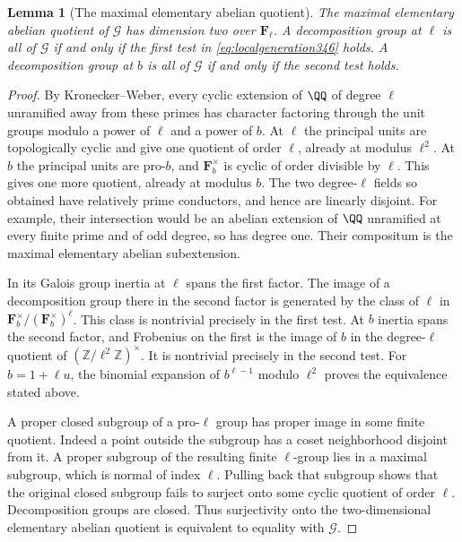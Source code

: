 \documentclass[a4paper,11pt]{article}
\newtheorem{lemma}[proposition]{Lemma}
\theoremstyle{definition}
\theoremstyle{remark}
\newcommand{\ZZ}{\mathbb Z}\newcommand{\ord}{\operatorname{ord}}
\numberwithin{equation}{section}
\begin{document}
\begin{lemma}[The maximal elementary abelian quotient]\leavevmode\label{lem:localgeneration346}
The maximal elementary abelian quotient of $\mathcal G$ has
dimension two over $\mathbf F_\ell$. A decomposition group at
$\ell$ is all of $\mathcal G$ if and only if the first test in
\eqref{eq:localgeneration346} holds. A decomposition group at
$b$ is all of $\mathcal G$ if and only if the second test holds.
\end{lemma}
\begin{proof}
By Kronecker--Weber, every cyclic extension of $\QQ$ of degree
$\ell$ unramified away from these primes has character factoring
through the unit groups modulo a power of $\ell$ and a power of
$b$. At $\ell$ the principal units are topologically cyclic and
give one quotient of order $\ell$, already at modulus $\ell^2$.
At $b$ the principal units are pro-$b$, and
$\mathbf F_b^\times$ is cyclic of order divisible by $\ell$.
This gives one more quotient, already at modulus $b$. The two
degree-$\ell$ fields so obtained have relatively prime conductors,
and hence are linearly disjoint. For example, their intersection
would be an abelian extension of $\QQ$ unramified at every finite
prime and of odd degree, so has degree one. Their compositum
is the maximal elementary abelian subextension.
\cite[Chapters V and VI]{V-III-V-cft101}

In its Galois group inertia at $\ell$ spans the first factor.
The image of a decomposition group there in the second factor is
generated by the class of $\ell$ in
$\mathbf F_b^\times/(\mathbf F_b^\times)^\ell$. This class is
nontrivial precisely in the first test. At $b$ inertia spans
the second factor, and Frobenius on the first is the image of
$b$ in the degree-$\ell$ quotient of $(\ZZ/\ell^2\ZZ)^\times$.
It is nontrivial precisely in the second test. For $b=1+\ell u$,
the binomial expansion of $b^{\ell-1}$ modulo $\ell^2$ proves
the equivalence stated above.

A proper closed subgroup of a pro-$\ell$ group has proper image
in some finite quotient. Indeed a point outside the subgroup has
a coset neighborhood disjoint from it. A proper subgroup of the
resulting finite $\ell$-group lies in a maximal subgroup, which
is normal of index $\ell$. Pulling back that subgroup shows that
the original closed subgroup fails to surject onto some cyclic
quotient of order $\ell$. Decomposition groups are closed. Thus
surjectivity onto the two-dimensional elementary abelian quotient
is equivalent to equality with $\mathcal G$.
\end{proof}
\end{document}
